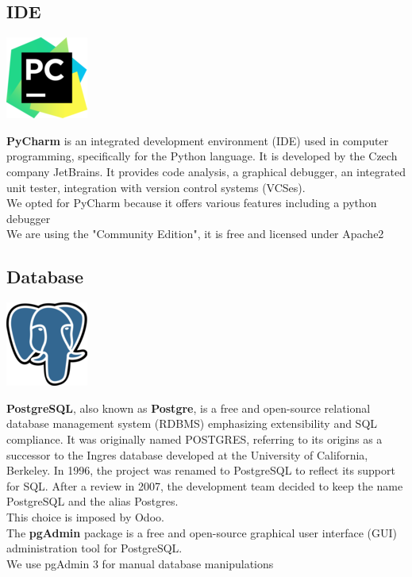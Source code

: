     \subsection*{IDE}
         \begin{center}
         \includegraphics[scale=0.8]{img/PyCharm102.png}\\
         \end{center}
    \textbf{PyCharm} is an integrated development environment (IDE) used in computer programming, specifically for the Python language. It is developed by the Czech company JetBrains. It provides code analysis, a graphical debugger, an integrated unit tester, integration with version control systems (VCSes).\cite{PyCharm}\\
    We opted for PyCharm because it offers various features including a python debugger\\
    We are using the "Community Edition", it is free and licensed under Apache2\\


  


    
    
    \subsection*{Database}

          \begin{center}
          \includegraphics[scale=0.8]{img/Postgre102.png}\\
          \end{center}
    \textbf{PostgreSQL}, also known as \textbf{Postgre}, is a free and open-source relational database management system (RDBMS) emphasizing extensibility and SQL compliance. It was originally named POSTGRES, referring to its origins as a successor to the Ingres database developed at the University of California, Berkeley. In 1996, the project was renamed to PostgreSQL to reflect its support for SQL. After a review in 2007, the development team decided to keep the name PostgreSQL and the alias Postgres.\cite{Postgre}\\
    This choice is imposed by Odoo.\\
    The \textbf{pgAdmin} package is a free and open-source graphical user interface (GUI) administration tool for PostgreSQL.\\
    We use pgAdmin 3 for manual database manipulations
    

